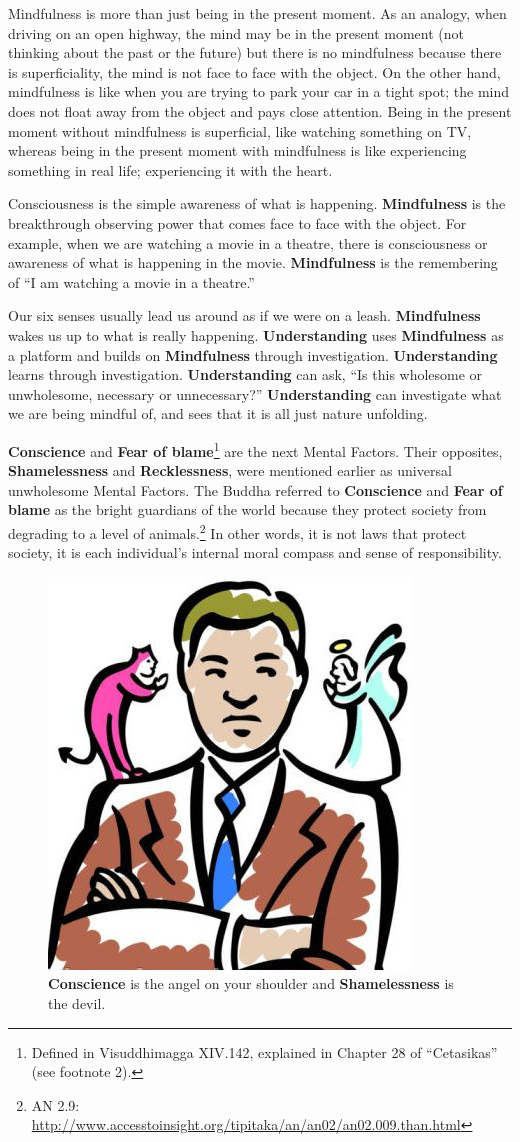 Mindfulness is more than just being in the present moment. As an analogy, when driving on an open highway, the mind may be in the present moment (not thinking about the past or the future) but there is no mindfulness because there is superficiality, the mind is not face to face with the object. On the other hand, mindfulness is like when you are trying to park your car in a tight spot; the mind does not float away from the object and pays close attention. Being in the present moment without mindfulness is superficial, like watching something on TV, whereas being in the present moment with mindfulness is like experiencing something in real life; experiencing it with the heart.

Consciousness is the simple awareness of what is happening. \textbf{Mindfulness} is the breakthrough observing power that comes face to face with the object. For example, when we are watching a movie in a theatre, there is consciousness or awareness of what is happening in the movie. \textbf{Mindfulness} is the remembering of “I am watching a movie in a theatre.” 

Our six senses usually lead us around as if we were on a leash. \textbf{Mindfulness} wakes us up to what is really happening. \textbf{Understanding} uses \textbf{Mindfulness} as a platform and builds on \textbf{Mindfulness} through investigation. \textbf{Understanding} learns through investigation. \textbf{Understanding} can ask, “Is this wholesome or unwholesome, necessary or unnecessary?” \textbf{Understanding} can investigate what we are being mindful of, and sees that it is all just nature unfolding.

\textbf{Conscience} and \textbf{Fear of blame}\footnote{Defined in Visuddhimagga XIV.142, explained in Chapter 28 of “Cetasikas” (see footnote 2).} are the next Mental Factors. Their opposites, \textbf{Shamelessness} and \textbf{Recklessness}, were mentioned earlier as universal unwholesome Mental Factors. The Buddha referred to \textbf{Conscience} and \textbf{Fear of blame} as the bright guardians of the world because they protect society from degrading to a level of animals.\footnote{AN 2.9: \url{http://www.accesstoinsight.org/tipitaka/an/an02/an02.009.than.html}} In other words, it is not laws that protect society, it is each individual’s internal moral compass and sense of responsibility.

\begin{figure}[H]
\centering
\includegraphics[width=0.17\linewidth]{./Diagrams/AngelDevil}
\caption{\textbf{Conscience} is the angel on your shoulder and \textbf{Shamelessness} is the devil.}
\label{fig:AngelDevil}
\end{figure}

